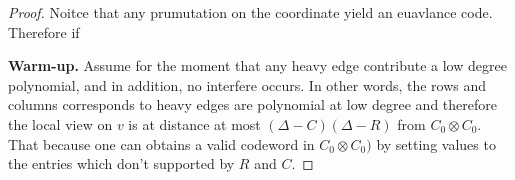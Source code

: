 \begin{proof}
  Noitce that any prumutation on the coordinate yield an euavlance code. Therefore if      

  \begin{center}
\end{center}


\textbf{Warm-up.} Assume for the moment that any heavy edge contribute a low degree polynomial, and in addition, no interfere occurs. In other words, the rows and columns corresponds to heavy edges are polynomial at low degree and therefore the local view on $v$ is at distance at most $ \left( \Delta - C \right)\left( \Delta - R \right) $ from $C_{0}\otimes C_{0}$. That because one can obtains a valid codeword in $C_{0}\otimes C_{0})$ by setting values to the entries which don't supported by $R$ and $C$.  


\end{proof}
